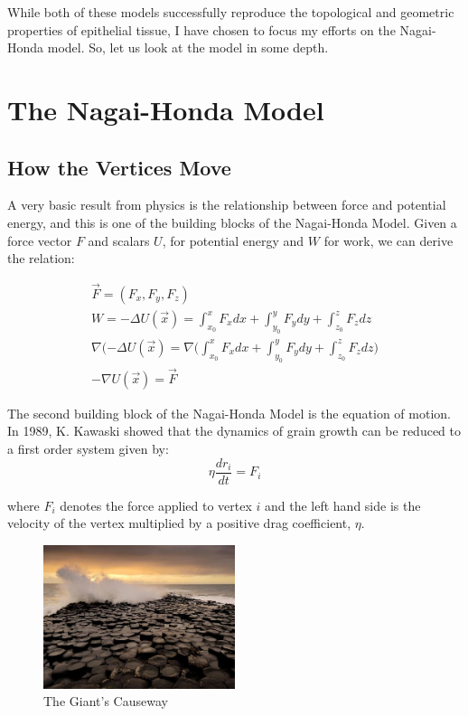 While both of these models successfully reproduce the topological and geometric properties of epithelial tissue, I have chosen to focus my efforts on the Nagai-Honda model. So, let us look at the model in some depth.

\section{The Nagai-Honda Model}
\subsection{How the Vertices Move}
A very basic result from physics is the relationship between force and potential energy, and this is one of the building blocks of the Nagai-Honda Model. Given a force vector $F$ and scalars $U$, for potential energy and $W$ for work, we can derive the relation:

\begin{gather}
\vec{F} = (F_x, F_y, F_z)\\
W = -\Delta U(\vec{x}) = \int_{x_0}^xF_xdx+\int_{y_0}^yF_ydy+\int_{z_0}^zF_zdz\\
\nabla(-\Delta U(\vec{x}) = \nabla\Bigg(\int_{x_0}^xF_xdx+\int_{y_0}^yF_ydy+\int_{z_0}^zF_zdz\Bigg)\\
-\nabla U(\vec{x}) = \vec{F}
\end{gather}

The second building block of the Nagai-Honda Model is the equation of motion. In 1989, K. Kawaski showed that the dynamics of grain growth can be reduced to a first order system given by:
\begin{equation}
\eta\frac{dr_i}{dt} = F_i
\end{equation}

where $F_i$ denotes the force applied to vertex $i$ and the left hand side is the velocity of the vertex multiplied by a positive drag coefficient, $\eta$\cite{1989 Kawasaki}.

\begin{figure}
\centering
\includegraphics[width=0.5\textwidth]{../diagrams/resize_giant.jpg}
\caption{The Giant's Causeway}
\label{fig:cause}
\end{figure}

